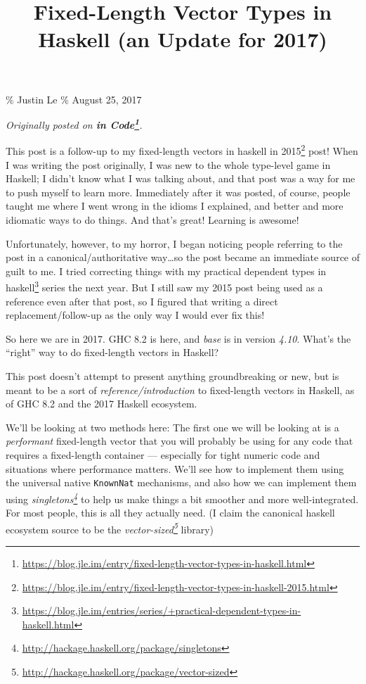 \documentclass[]{article}
\title{Fixed-Length Vector Types in Haskell (an Update for 2017)}
\renewcommand{\href}[2]{#2\footnote{\url{#1}}}
\begin{document}
\maketitle

\% Justin Le \% August 25, 2017

\emph{Originally posted on
\textbf{\href{https://blog.jle.im/entry/fixed-length-vector-types-in-haskell.html}{in
Code}}.}

This post is a follow-up to my
\href{https://blog.jle.im/entry/fixed-length-vector-types-in-haskell-2015.html}{fixed-length
vectors in haskell in 2015} post! When I was writing the post originally, I was
new to the whole type-level game in Haskell; I didn't know what I was talking
about, and that post was a way for me to push myself to learn more. Immediately
after it was posted, of course, people taught me where I went wrong in the
idioms I explained, and better and more idiomatic ways to do things. And that's
great! Learning is awesome!

Unfortunately, however, to my horror, I began noticing people referring to the
post in a canonical/authoritative way\ldots so the post became an immediate
source of guilt to me. I tried correcting things with my
\href{https://blog.jle.im/entries/series/+practical-dependent-types-in-haskell.html}{practical
dependent types in haskell} series the next year. But I still saw my 2015 post
being used as a reference even after that post, so I figured that writing a
direct replacement/follow-up as the only way I would ever fix this!

So here we are in 2017. GHC 8.2 is here, and \emph{base} is in version
\emph{4.10}. What's the ``right'' way to do fixed-length vectors in Haskell?

This post doesn't attempt to present anything groundbreaking or new, but is
meant to be a sort of \emph{reference/introduction} to fixed-length vectors in
Haskell, as of GHC 8.2 and the 2017 Haskell ecosystem.

We'll be looking at two methods here: The first one we will be looking at is a
\emph{performant} fixed-length vector that you will probably be using for any
code that requires a fixed-length container --- especially for tight numeric
code and situations where performance matters. We'll see how to implement them
using the universal native \texttt{KnownNat} mechanisms, and also how we can
implement them using
\emph{\href{http://hackage.haskell.org/package/singletons}{singletons}} to help
us make things a bit smoother and more well-integrated. For most people, this is
all they actually need. (I claim the canonical haskell ecosystem source to be
the \emph{\href{http://hackage.haskell.org/package/vector-sized}{vector-sized}}
library)
\end{document}
